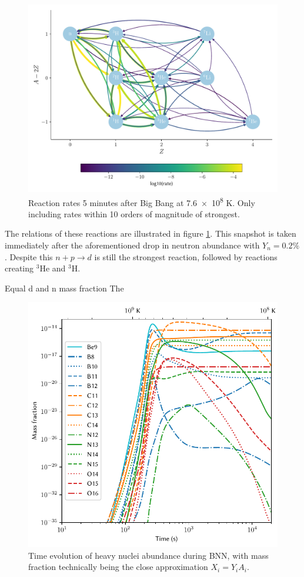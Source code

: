 \begin{figure}[ht]
    \includegraphics[width=5.1in]{figures/smallnet5minutes.pdf}
    \caption{Reaction rates 5 minutes after Big Bang at \num{7.6e8} K. Only including rates within 10 orders of magnitude of strongest.}
    \label{fig:5minutenet}
\end{figure}

The relations of these reactions are illustrated in figure \ref{fig:5minutenet}. This snapshot is taken immediately after the aforementioned drop in neutron abundance with $Y_n=0.2\%$. Despite this $n+p\rightarrow d$ is still the strongest reaction, followed by reactions creating ${}^3$He and ${}^3$H. 

Equal d and n mass fraction
The 

\begin{figure}[ht]
    \includegraphics[width=5.1in]{figures/abundanceheavy.pdf}
    \caption{Time evolution of heavy nuclei abundance during BNN, with mass fraction technically being the close approximation $X_i=Y_i A_i$.}
    \label{fig:heavyXevo}
\end{figure}




